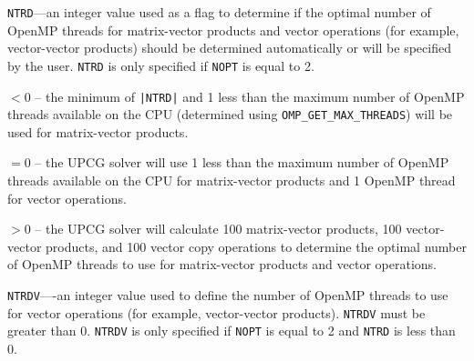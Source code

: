 \documentclass[12pt]{article} %
\begin{document}
\begin{description}
\item \texttt{NTRD}---an integer value used as a flag to determine if the optimal number of OpenMP threads for matrix-vector products and vector operations (for example, vector-vector products) should be determined automatically or will be specified by the user. \texttt{NTRD} is only specified if \texttt{NOPT} is equal to 2.
\begin{description}
\item $<$0 -- the minimum of \texttt{|NTRD|} and 1 less than the maximum number of OpenMP threads available on the CPU (determined using \texttt{OMP\_GET\_MAX\_THREADS}) will be used for matrix-vector products.
\item $=$0 -- the UPCG solver will use 1 less than the maximum number of OpenMP threads available on the CPU for matrix-vector products and 1 OpenMP thread for vector operations. 
\item $>$0 -- the UPCG solver will calculate 100 matrix-vector products, 100 vector-vector products, and 100 vector copy operations to determine the optimal number of OpenMP threads to use for matrix-vector products and vector operations.
\end{description}
\item \texttt{NTRDV}----an integer value used to define the number of OpenMP threads to use for vector operations (for example, vector-vector products). \texttt{NTRDV} must be greater than 0. \texttt{NTRDV} is only specified if \texttt{NOPT} is equal to 2 and \texttt{NTRD} is less than 0.



\end{description}
\end{document}

